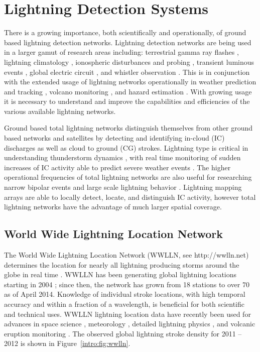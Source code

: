 \section{Lightning Detection Systems}

There is a growing importance, both scientifically and operationally, of ground based lightning detection networks.
Lightning detection networks are being used in a larger gamut of research areas including: terrestrial gamma ray flashes \citep{Dwyer2012, Gjesteland2011, Connaughton2010}, lightning climatology \citep{Virts2013, Virts2011a, Burgesser2012}, ionospheric disturbances and probing \citep{Jacobson2010, Singh2011}, transient luminous events \citep{Soula2011}, global electric circuit  \citep{Holzworth2005}, and whistler observation \citep{Collier2010, Collier2011a, Burkholder2013}.
This is in conjunction with the extended usage of lightning networks operationally in weather prediction and tracking \citep{Fierro2012, Pan2010, Thomas2010d}, volcano monitoring \citep{Doughton2010}, and hazard estimation \citep{Altaratz2010}.
With growing usage it is necessary to understand and improve the capabilities and efficiencies of the various available lightning networks.

Ground based total lightning networks distinguish themselves from other ground based networks and satellites by detecting and identifying in-cloud (IC) discharges as well as cloud to ground (CG) strokes.
Lightning type is critical in understanding thunderstorm dynamics \citep{Williams1989}, with real time monitoring of sudden increases of IC activity able to predict severe weather events \citep{Rudlosky2013, Darden2010, Metzger2013, Schultz2009, Schultz2011}.
The higher operational frequencies of total lightning networks are also useful for researching narrow bipolar events \citep{Suszcynsky2003} and large scale lightning behavior \citep{Hutchins2013}.
Lightning mapping arrays are able to locally detect, locate, and distinguish IC activity, however total lightning networks have the advantage of much larger spatial coverage.

\subsection{World Wide Lightning Location Network}

The World Wide Lightning Location Network (WWLLN, see http://wwlln.net) determines the location for nearly all lightning producing storms around the globe in real time \citep{Jacobson2006c}.
WWLLN has been generating global lightning locations starting in 2004 \citep{Rodger2006, Rodger2009}; since then, the network has grown from 18 stations to over 70 as of April 2014.
Knowledge of individual stroke locations, with high temporal accuracy and within a fraction of a wavelength, is beneficial for both scientific and technical uses.
WWLLN lightning location data have recently been used for advances in space science \citep{Lay2007, Kumar2009, Collier2009, Holzworth2011, Jacobson2011}, meteorology \citep{Price2009,Thomas2010d}, detailed lightning physics \citep{Connaughton2010}, and volcanic eruption monitoring \citep{Doughton2010}.
The observed global lightning stroke density for 2011 -- 2012 is shown in Figure~\ref{intro:fig:wwlln}.

